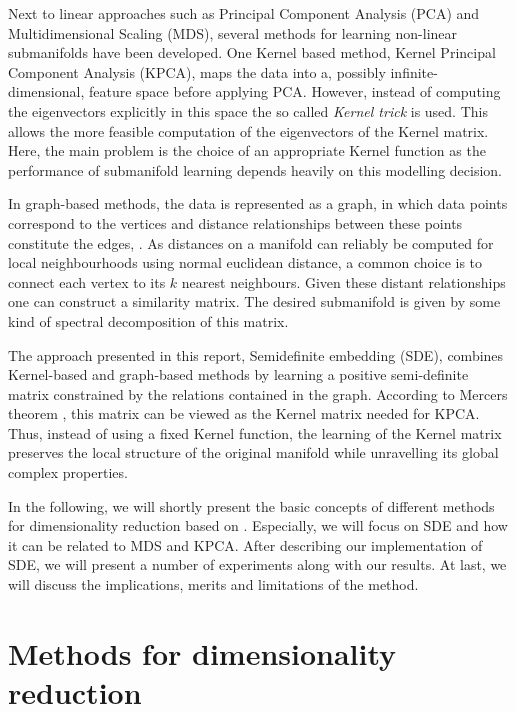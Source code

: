 \documentclass[a4paper,12pt]{article}
\begin{document}
Next to linear approaches such as Principal Component Analysis (PCA) and Multidimensional Scaling (MDS), several methods for learning non-linear submanifolds have been developed. One Kernel based method, Kernel Principal Component Analysis (KPCA), maps the data into a, possibly infinite-dimensional, feature space before applying PCA. However, instead of computing the eigenvectors explicitly in this space the so called \emph{Kernel trick} is used. This allows the more feasible computation of the eigenvectors of the Kernel matrix. Here, the main problem is the choice of an appropriate Kernel function as the performance of submanifold learning depends heavily on this modelling decision.


In graph-based methods, the data is represented as a graph, in which data points correspond to the vertices and distance relationships between these points constitute the edges, \cite{Murphy}. As distances on a manifold can reliably be computed for local neighbourhoods using normal euclidean distance, a common choice is to connect each vertex to its $k$ nearest neighbours. Given these distant relationships one can construct a similarity matrix. The desired submanifold is given by some kind of spectral decomposition of this matrix.


The approach presented in this report, Semidefinite embedding (SDE), combines Kernel-based and graph-based methods by learning a positive semi-definite matrix constrained by the relations contained in the graph. According to Mercers theorem \cite{mercer}, this matrix can be viewed as the Kernel matrix needed for KPCA. Thus, instead of using a fixed Kernel function, the learning of the Kernel matrix preserves the local structure of the original manifold while unravelling its global complex properties.


In the following, we will shortly present the basic concepts of different methods for dimensionality reduction based on \cite{saul06}. Especially, we will focus on SDE and how it can be related to MDS and KPCA. After describing our implementation of SDE, we will present a number of experiments along with our results. At last, we will discuss the implications, merits and limitations of the method. 

\section{Methods for dimensionality reduction}
\label{sec:relwork}
\end{document}
